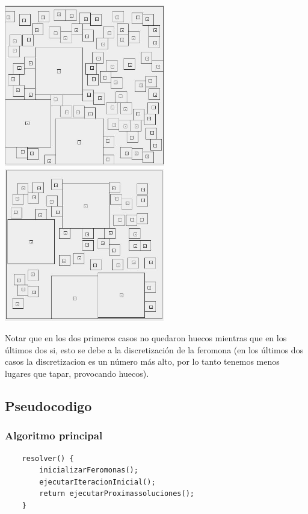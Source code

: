 \begin{center}
\includegraphics[width=7cm]{imagenes/ejemplo6}
\includegraphics[width=7cm]{imagenes/ejemplo4}

\end{center}

Notar que en los dos primeros casos no quedaron huecos mientras que en los \'ultimos dos si, esto se debe a la discretizaci\'on de la feromona (en los \'ultimos dos casos la discretizacion es un n\'umero m\'as alto, por lo tanto tenemos menos lugares que tapar, provocando huecos).

\newpage


\subsection{Pseudocodigo}
\subsubsection{Algoritmo principal}

\begin{verbatim}
    resolver() {
        inicializarFeromonas();
        ejecutarIteracionInicial();
        return ejecutarProximassoluciones();
    }
\end{verbatim}

